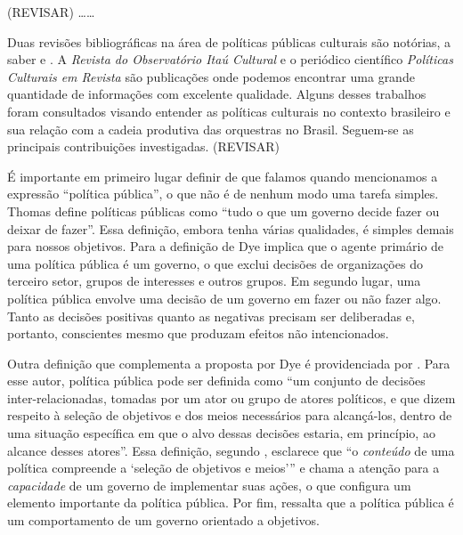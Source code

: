 \documentclass[a4paper, 12pt, openright, oneside, german, french, english, brazil]{abntex2}
\begin{document}
	(REVISAR) \ldots \dots
	
	
	
	Duas revisões bibliográficas na área de políticas públicas culturais são notórias, a saber  e . A \textit{Revista do Observatório Itaú Cultural} e o periódico científico \textit{Políticas Culturais em Revista} são publicações onde podemos encontrar uma grande quantidade de informações com excelente qualidade. Alguns desses trabalhos foram consultados visando entender as políticas culturais no contexto brasileiro e sua relação com a cadeia produtiva das orquestras no Brasil. Seguem-se as principais contribuições investigadas. (REVISAR)
	
	É importante em primeiro lugar definir de que falamos quando mencionamos a expressão ``política pública'', o que não é de nenhum modo uma tarefa simples. Thomas  define políticas públicas como ``tudo o que um governo decide fazer ou deixar de fazer''. Essa definição, embora tenha várias qualidades, é simples demais para nossos objetivos. Para  a definição de Dye implica que o agente primário de uma política pública é um governo, o que exclui decisões de organizações do terceiro setor, grupos de interesses e outros grupos. Em segundo lugar, uma política pública envolve uma decisão de um governo em fazer ou não fazer algo. Tanto as decisões positivas quanto as negativas precisam ser deliberadas e, portanto, conscientes mesmo que produzam efeitos não intencionados. 
	
	Outra definição que complementa a proposta por Dye é providenciada por . Para esse autor, política pública pode ser definida como ``um conjunto de decisões inter-relacionadas, tomadas por um ator ou grupo de atores políticos, e que dizem respeito à seleção de objetivos e dos meios necessários para alcançá-los, dentro de uma situação específica em que o alvo dessas decisões estaria, em princípio, ao alcance desses atores''. Essa definição, segundo , esclarece que ``o \textit{conteúdo} de uma política compreende a `seleção de objetivos e meios''' e chama a atenção para a \textit{capacidade} de um governo de implementar suas ações, o que configura um elemento importante da política pública. Por fim,  ressalta que a política pública é um comportamento de um governo orientado a objetivos.
	
\end{document}
